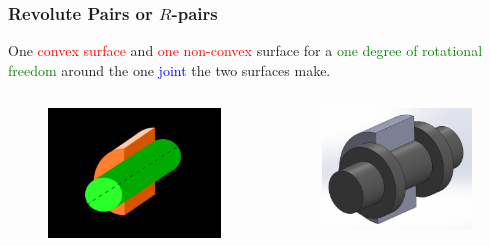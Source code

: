 \begin{frame}
	\frametitle{Revolute Pairs or $R$-pairs}
	\footnotesize{One \textcolor{red}{convex surface} and \textcolor{red}{one non-convex} surface for a \textcolor{green}{one degree of rotational freedom} around the one \textcolor{blue}{joint} the two surfaces make.}
	\begin{columns}[t]		
		\begin{column}{.5\textwidth}
			\begin{figure}
				\centering
				\includegraphics[width=\textwidth]{figures/revolute.jpg}
			\end{figure}
		\end{column}
		\begin{column}{.5\textwidth}
			\begin{figure}
				\centering
				\includegraphics[width=\textwidth]{figures/revolute_cutaway.jpg}

\end{figure}
\end{column}
\end{columns}
\end{frame}
